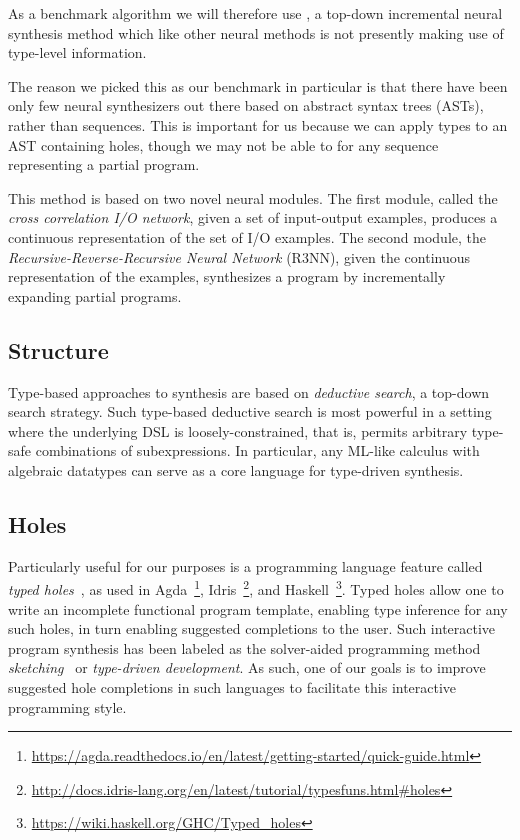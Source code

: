 \documentclass{article}
\begin{document}
As a benchmark algorithm we will therefore use \cite{nsps}, a top-down incremental neural synthesis method which like other neural methods is not presently making use of type-level information.

The reason we picked this as our benchmark in particular is that there have been only few neural synthesizers out there based on abstract syntax trees (ASTs), rather than sequences.
This is important for us because we can apply types to an AST containing holes, though we may not be able to for any sequence representing a partial program.

This method is based on two novel neural modules.
The first module, called the \emph{cross correlation I/O network}, given a set of input-output examples, produces a continuous representation of the set of I/O examples.
The second module, the \emph{Recursive-Reverse-Recursive Neural Network} (R3NN), given the continuous representation of the examples, synthesizes a program by incrementally expanding partial programs.~\citep{nsps}



\subsection{Structure}

Type-based approaches to synthesis are based on \emph{deductive search}, a top-down search strategy.
Such type-based deductive search is most powerful in a setting where the underlying DSL is loosely-constrained,
that is, permits arbitrary type-safe combinations of subexpressions.
In particular, any ML-like calculus with algebraic datatypes can serve as a core language for type-driven synthesis.~\citep{gulwani2017program}

\subsection{Holes}

Particularly useful for our purposes is a programming language feature called \emph{typed holes}~\citep{hashimoto1997typed},
as used in Agda~\footnote{\url{https://agda.readthedocs.io/en/latest/getting-started/quick-guide.html}},
Idris~\footnote{\url{http://docs.idris-lang.org/en/latest/tutorial/typesfuns.html\#holes}},
and Haskell~\footnote{\url{https://wiki.haskell.org/GHC/Typed_holes}}.
Typed holes allow one to write an incomplete functional program template,
enabling type inference for any such holes, in turn enabling suggested completions to the user.
Such interactive program synthesis has been labeled as the solver-aided
programming method \emph{sketching}~\citep{gulwani2017program} or
\emph{type-driven development}.
As such, one of our goals is to improve suggested hole completions in such languages to facilitate this interactive programming style.
\end{document}
